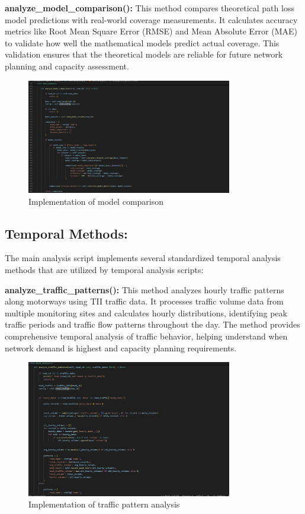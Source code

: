 \documentclass[MScCS]{uccthesis}
\begin{document}
\textbf{analyze\_model\_comparison():}
This method compares theoretical path loss model predictions with real-world coverage measurements. It calculates accuracy metrics like Root Mean Square Error (RMSE) and Mean Absolute Error (MAE) to validate how well the mathematical models predict actual coverage. This validation ensures that the theoretical models are reliable for future network planning and capacity assessment.

\begin{figure}[H]
   \centering
   \includegraphics[width=0.8\textwidth]{Images/analyze_model_comparison.png}
   \caption{Implementation of model comparison}
   \label{fig:analyze_model_comparison}
   \end{figure}


\subsection{Temporal Methods:}
The main analysis script implements several standardized temporal analysis methods that are utilized by temporal analysis scripts:

\textbf{analyze\_traffic\_patterns():}
This method analyzes hourly traffic patterns along motorways using TII traffic data. It processes traffic volume data from multiple monitoring sites and calculates hourly distributions, identifying peak traffic periods and traffic flow patterns throughout the day. The method provides comprehensive temporal analysis of traffic behavior, helping understand when network demand is highest and capacity planning requirements.

\begin{figure}[H]
   \centering
   \includegraphics[width=0.8\textwidth]{Images/analyze_traffic_patterns.png}
   \caption{Implementation of traffic pattern analysis}
   \label{fig:temporal_traffic_patterns}
\end{figure}
\end{document}
